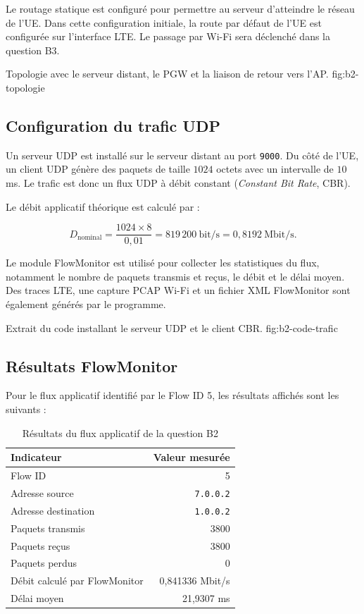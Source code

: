 Le routage statique est configuré pour permettre au serveur
d'atteindre le réseau de l'UE. Dans cette configuration
initiale, la route par défaut de l'UE est configurée sur
l'interface LTE. Le passage par Wi-Fi sera déclenché dans
la question B3.

{Topologie avec le serveur distant, le PGW et la liaison de retour vers l'AP.}
{fig:b2-topologie}

\subsection{Configuration du trafic UDP}

Un serveur UDP est installé sur le serveur distant au port
\texttt{9000}. Du côté de l'UE, un client UDP génère des
paquets de taille $1024$ octets avec un intervalle de
$10$ ms. Le trafic est donc un flux UDP à débit constant
(\textit{Constant Bit Rate}, CBR).

Le débit applicatif théorique est calculé par :

\[
D_{\mathrm{nominal}}
=
\frac{1024 \times 8}{0,01}
=
819\,200\ \mathrm{bit/s}
=
0,8192\ \mathrm{Mbit/s}.
\]

Le module FlowMonitor est utilisé pour collecter les
statistiques du flux, notamment le nombre de paquets
transmis et reçus, le débit et le délai moyen. Des traces
LTE, une capture PCAP Wi-Fi et un fichier XML FlowMonitor
sont également générés par le programme.

{Extrait du code installant le serveur UDP et le client CBR.}
{fig:b2-code-trafic}

\subsection{Résultats FlowMonitor}

Pour le flux applicatif identifié par le Flow ID 5, les
résultats affichés sont les suivants :

\begin{table}[H]
    \centering
    \caption{Résultats du flux applicatif de la question B2}
    \label{tab:b2-resultats}
    \begin{tabular}{lr}
        \toprule
        \textbf{Indicateur} & \textbf{Valeur mesurée} \\
        \midrule
        Flow ID & 5 \\
        Adresse source & \texttt{7.0.0.2} \\
        Adresse destination & \texttt{1.0.0.2} \\
        Paquets transmis & 3800 \\
        Paquets reçus & 3800 \\
        Paquets perdus & 0 \\
        Débit calculé par FlowMonitor & 0,841336 Mbit/s \\
        Délai moyen & 21,9307 ms \\
        \bottomrule
    \end{tabular}
\end{table}

